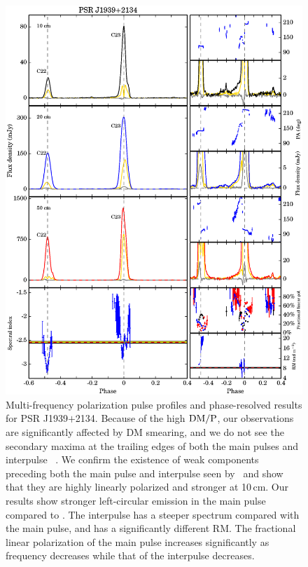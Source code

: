 \documentclass[useAMS,usenatbib]{mn2e}
\begin{document}
\begin{appendix}
\begin{figure}
\begin{center}
\includegraphics[width=6 in]{1939.ps}
\caption{Multi-frequency polarization pulse profiles and phase-resolved results for PSR J1939$+$2134. 
Because of the high $\rm{DM}/P$, our observations 
are significantly affected by DM smearing, and we do not see the secondary 
maxima at the trailing edges of both the main pulses and interpulse
~\citep{Thorsett90,Stairs99,Ord04}.
%
We confirm the existence of weak components preceding both the main pulse 
and interpulse seen by~\citet{Yan11}  and show that they are highly linearly 
polarized and stronger at 10\,cm. 
%
Our results show stronger left-circular emission in the main pulse compared 
to \citet{Yan11}.
%
The interpulse has a steeper spectrum compared with the main pulse, and has 
a significantly different RM.
%
The fractional linear polarization of the main pulse increases significantly 
as frequency decreases while that of the interpulse decreases.
}
\label{1939}
\end{center}
\end{figure}


\end{appendix}
\end{document}
